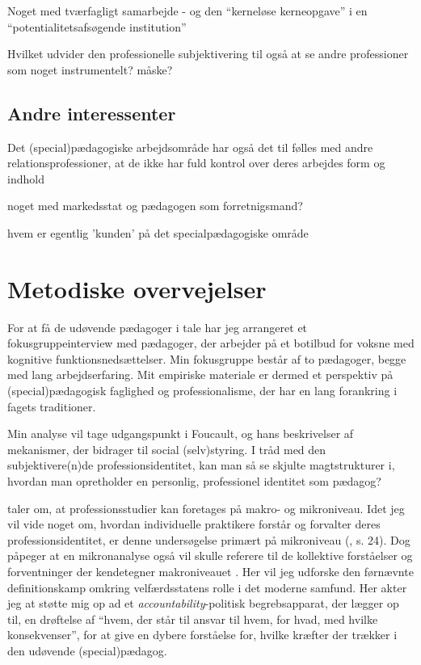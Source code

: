 Noget med tværfagligt samarbejde - og den “kerneløse kerneopgave” i en “potentialitetsafsøgende institution” \autocite{mik-meyerIndledningSkabeProfessionel2012}

Hvilket udvider den professionelle subjektivering til også at se andre professioner som noget instrumentelt? måske?

\subsection{Andre interessenter}
Det (special)pædagogiske arbejdsområde har også det til følles med andre  relationsprofessioner, at de ikke har fuld kontrol over deres arbejdes form og indhold

noget med markedsstat og pædagogen som forretnigsmand?

hvem er egentlig 'kunden' på det specialpædagogiske område
\section{Metodiske overvejelser}

For at få de udøvende pædagoger i tale har jeg arrangeret et fokusgruppeinterview med pædagoger, der arbejder på et botilbud for voksne med kognitive funktionsnedsættelser.
Min fokusgruppe består af to pædagoger, begge med lang arbejdserfaring.
Mit empiriske materiale er dermed et perspektiv på (special)pædagogisk faglighed og professionalisme, der har en lang forankring i fagets traditioner.

Min analyse vil tage udgangspunkt i Foucault, og hans beskrivelser af mekanismer, der bidrager til social (selv)styring. I tråd med den subjektivere(n)de professionsidentitet, kan man så se skjulte magtstrukturer i, hvordan man opretholder en personlig, professionel identitet som pædagog?

\citeauthor{molanderProfesjonsstudierIntroduksjon2008} taler om, at  professionsstudier kan foretages på makro- og mikroniveau.
Idet jeg vil vide noget om, hvordan individuelle praktikere forstår og forvalter deres professionsidentitet, er denne undersøgelse primært på mikroniveau (\citeyear{molanderProfesjonsstudierIntroduksjon2008}, s. 24).
Dog påpeger \citeauthor{molanderProfesjonsstudierIntroduksjon2008} at en mikronanalyse også vil skulle referere til de kollektive forståelser og forventninger der kendetegner makroniveauet \autocite[s. 24]{molanderProfesjonsstudierIntroduksjon2008}.
Her vil jeg udforske den førnævnte definitionskamp omkring velfærdsstatens rolle i det moderne samfund.
Her akter jeg at støtte mig op ad et \textit{accountability}-politisk begrebsapparat, der lægger op til, en drøftelse af “hvem, der står til ansvar til hvem, for hvad, med hvilke konsekvenser”, for at give en dybere forståelse for, hvilke kræfter der trækker i den udøvende (special)pædagog.


